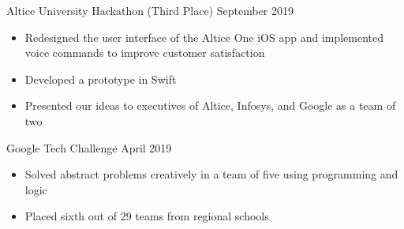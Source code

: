 \documentclass{article}
\newcommand \spacingBetweenHeadings {0.5em}
\begin{document}
\noindent
Altice University Hackathon (Third Place)
\hfill
September 2019\\
\vspace{-1em}
\begin{itemize}
\item Redesigned the user interface of the Altice One iOS app and implemented voice commands to improve customer satisfaction
\item Developed a prototype in Swift
\item Presented our ideas to executives of Altice, Infosys, and Google as a team of two
\end{itemize}

\noindent
Google Tech Challenge
\hfill
April 2019\\
\vspace{-1em}
\begin{itemize}
\item Solved abstract problems creatively in a team of five using programming and logic
\item Placed sixth out of 29 teams from regional schools
\end{itemize}
\vspace{\spacingBetweenHeadings}

\end{document}

